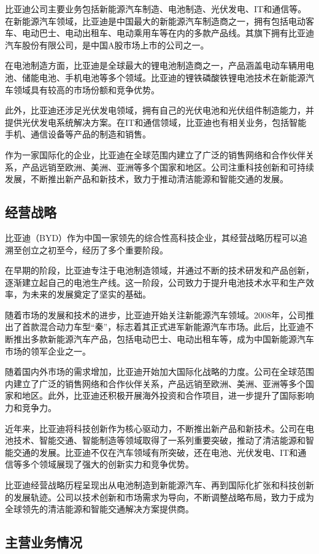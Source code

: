 比亚迪公司主要业务包括新能源汽车制造、电池制造、光伏发电、IT和通信等。在新能源汽车领域，比亚迪是中国最大的新能源汽车制造商之一，拥有包括电动客车、电动巴士、电动出租车、电动乘用车等在内的多款产品线。其旗下拥有比亚迪汽车股份有限公司，是中国A股市场上市的公司之一。

在电池制造方面，比亚迪是全球最大的锂电池制造商之一，产品涵盖电动车辆用电池、储能电池、手机电池等多个领域。比亚迪的锂铁磷酸铁锂电池技术在新能源汽车领域具有较高的市场份额和竞争优势。

此外，比亚迪还涉足光伏发电领域，拥有自己的光伏电池和光伏组件制造能力，并提供光伏发电系统解决方案。在IT和通信领域，比亚迪也有相关业务，包括智能手机、通信设备等产品的制造和销售。

作为一家国际化的企业，比亚迪在全球范围内建立了广泛的销售网络和合作伙伴关系，产品远销至欧洲、美洲、亚洲等多个国家和地区。公司注重科技创新和可持续发展，不断推出新产品和新技术，致力于推动清洁能源和智能交通的发展。
\subsection{经营战略}
比亚迪（BYD）作为中国一家领先的综合性高科技企业，其经营战略历程可以追溯至创立之初至今，经历了多个重要阶段。

在早期的阶段，比亚迪专注于电池制造领域，并通过不断的技术研发和产品创新，逐渐建立起自己的电池生产线。这一阶段，公司致力于提升电池技术水平和生产效率，为未来的发展奠定了坚实的基础。

随着市场的发展和技术的进步，比亚迪开始关注新能源汽车领域。2008年，公司推出了首款混合动力车型“秦”，标志着其正式进军新能源汽车市场。此后，比亚迪不断推出多款新能源汽车产品，包括电动巴士、电动出租车等，成为中国新能源汽车市场的领军企业之一。

随着国内外市场的需求增加，比亚迪开始加大国际化战略的力度。公司在全球范围内建立了广泛的销售网络和合作伙伴关系，产品远销至欧洲、美洲、亚洲等多个国家和地区。此外，比亚迪还积极开展海外投资和合作项目，进一步提升了国际影响力和竞争力。

近年来，比亚迪将科技创新作为核心驱动力，不断推出新产品和新技术。公司在电池技术、智能交通、智能制造等领域取得了一系列重要突破，推动了清洁能源和智能交通的发展。比亚迪不仅在汽车领域有所突破，还在电池、光伏发电、IT和通信等多个领域展现了强大的创新实力和竞争优势。

比亚迪经营战略历程呈现出从电池制造到新能源汽车、再到国际化扩张和科技创新的发展轨迹。公司以技术创新和市场需求为导向，不断调整战略布局，致力于成为全球领先的清洁能源和智能交通解决方案提供商。
\subsection{主营业务情况}

